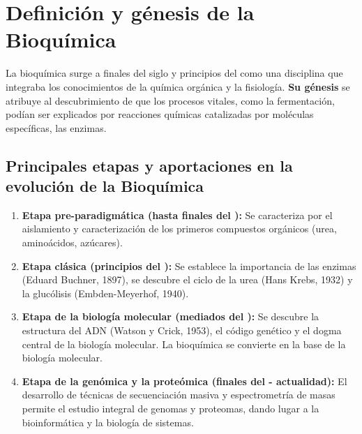 
\section{Definición y génesis de la Bioquímica}



La bioquímica surge a finales del siglo  y principios del  como una disciplina que integraba los conocimientos de la química orgánica y la fisiología. \textbf{Su génesis} se atribuye al descubrimiento de que los procesos vitales, como la fermentación, podían ser explicados por reacciones químicas catalizadas por moléculas específicas, las enzimas.

\subsection{Principales etapas y aportaciones en la evolución de la Bioquímica}

\begin{enumerate}
    \item \textbf{Etapa pre-paradigmática (hasta finales del ):} Se caracteriza por el aislamiento y caracterización de los primeros compuestos orgánicos (urea, aminoácidos, azúcares).
    \item \textbf{Etapa clásica (principios del ):} Se establece la importancia de las enzimas (Eduard Buchner, 1897), se descubre el ciclo de la urea (Hans Krebs, 1932) y la glucólisis (Embden-Meyerhof, 1940).
    \item \textbf{Etapa de la biología molecular (mediados del ):} Se descubre la estructura del ADN (Watson y Crick, 1953), el código genético y el dogma central de la biología molecular. La bioquímica se convierte en la base de la biología molecular.
    \item \textbf{Etapa de la genómica y la proteómica (finales del  - actualidad):} El desarrollo de técnicas de secuenciación masiva y espectrometría de masas permite el estudio integral de genomas y proteomas, dando lugar a la bioinformática y la biología de sistemas.
\end{enumerate}

